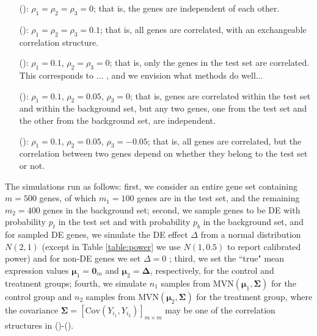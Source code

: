 	\begin{enumerate}
		\item[(\aaCase):] $\rho_1 = \rho_2 = \rho_3 = 0$; that is, the genes are independent of each
		other.
		\item[(\cCase):] $\rho_1 = \rho_2 = \rho_3 = 0.1$; that is, all genes are correlated, with 
		an
		exchangeable correlation structure. 
		\item[(\aCase):] $\rho_1 = 0.1$, $\rho_2 = \rho_3 = 0$; that is, only the genes in the test 
		set
		are correlated. This corresponds to ... , and we envision what methods do well...
		\item[(\eCase):] $\rho_1 = 0.1$, $\rho_2 = 0.05$, $\rho_3 = 0$; that is, 
		genes are correlated within the test set and within the background set, but any two genes, 
		one
		from the test set and the other from the background set, are independent.
		\item[(\fCase):] $\rho_1 = 0.1$, $\rho_2 = 0.05$, $\rho_3 = -0.05$; that is, all genes are
		correlated, but the correlation between two genes depend on whether they belong to the test 
		set or
		not.
	\end{enumerate}
	
	The simulations run as follows: first, we consider an entire gene set containing $m=500$ genes,
	of which $m_1 = 100$ genes are in the test set, and the
	remaining $m_2=400$ genes in the background set; second, we sample genes to be DE with 
	probability 
	$p_t$ in the test set and with probability $p_b$ in the background set, and for sampled DE 
	genes, we simulate the DE effect $\Delta$ from  a normal distribution $N(2, 1)$ (except in 
	Table \ref{table:power} we use $N(1, 0.5)$ to report calibrated power) and for non-DE genes we 
	set $\Delta= 0$ ; third, we set the ``true" mean expression values $\bm \mu_1 = \bm 0_m$ and 
	$\bm \mu_2 = \bm \Delta$, respectively,
	for the control and treatment groups; fourth, we simulate $n_1$ samples from $\text{MVN}(\bm 
	\mu_1,
	\bm \Sigma)$ for the control group and $n_2$ samples from $\text{MVN}(\bm \mu_2, \bm \Sigma)$ 
	for
	the treatment group, where the covariance $\bm \Sigma = \left[\text{Cov}(Y_{i_1},
	Y_{i_2})\right]_{m\times m}$ may be one of the correlation structures in (\aaCase)-(\fCase).
	

